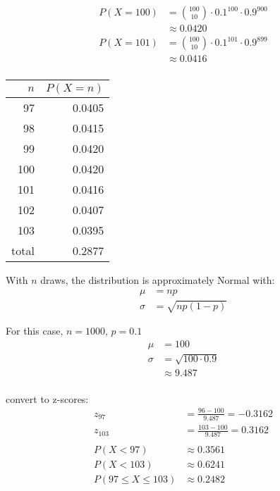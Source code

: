 \documentclass[letterpaper, landscape]{exam}
\begin{document}
  \begin{align*}
    P(X = 100)  & = \binom{100}{10} \cdot 0.1^{100} \cdot 0.9^{900} \\
              & \approx 0.0420 \\
    P(X = 101) & = \binom{100}{10} \cdot 0.1^{101} \cdot 0.9^{899} \\
              & \approx 0.0416 \\
  \end{align*}

  \begin{tabular}[H]{rr}
    \toprule
    $n$ & $P(X = n)$ \\
    \midrule
    97    & 0.0405 \\
    98    & 0.0415 \\
    99    & 0.0420 \\
    100   & 0.0420 \\
    101   & 0.0416 \\
    102   & 0.0407 \\
    103   & 0.0395 \\
    \midrule
    total & 0.2877 \\
    \bottomrule
  \end{tabular}

  With $n$ draws, the distribution is approximately Normal with:
  \begin{align*}
    \mu    & = np \\
    \sigma & = \sqrt{np(1 -p)}
  \end{align*}

  For this case, $n = 1000$, $p = 0.1$
  \begin{align*}
    \mu    & = 100 \\
    \sigma & = \sqrt{100 \cdot 0.9} \\
           & \approx 9.487 \\
  \end{align*}

  convert to z-scores:
  \begin{align*}
    z_{97}  & = \frac{96 - 100}{9.487} = -0.3162 \\
    z_{103} & = \frac{103 - 100}{9.487} = 0.3162 \\
    \\
    P(X < 97)             & \approx 0.3561 \\
    P(X < 103)            & \approx 0.6241 \\
    P(97 \leq X \leq 103) & \approx 0.2482 \\
  \end{align*}
\end{document}
